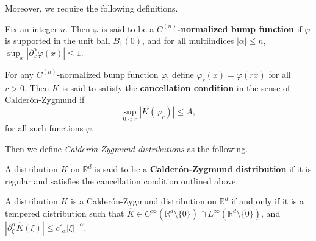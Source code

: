 \documentclass{article}
\begin{document}
Moreover, we require the following definitions. 

\begin{definition}
	Fix an integer $n$. Then $\varphi$ is said to be a \textbf{$C^{(n)}$-normalized bump function} if $\varphi$ is supported in the unit ball $B_{1}(0)$, and for all multiindices $|\alpha|\leq n$, $\sup_{x}|\partial_{x}^{\alpha}\varphi(x)|\leq 1$. 
\end{definition} 
\begin{definition}
	For any $C^{(n)}$-normalized bump function $\varphi$, define $\varphi_{r}(x) = \varphi(rx)$ for all $r > 0$. Then $K$ is said to satisfy the \textbf{cancellation condition} in the sense of Calder{\'o}n-Zygmund if 
	\begin{equation}
		\sup_{0 < r}|K(\varphi_{r})| \leq A, 
	\end{equation}
	for all such functions $\varphi$. 
\end{definition} 
Then we define \textit{Calder{\'on}-Zygmund distributions} as the following. 
\begin{definition}
	A distribution $K$ on $\mathbb{R}^{d}$ is said to be a \textbf{Calder\'on-Zygmund distribution} if it is regular and satisfies the cancellation condition outlined above. 
\end{definition} 

\begin{prop}
	A distribution $K$ is a Calder\'on-Zygmund distribution on $\mathbb{R}^{d}$ if and only if it is a tempered distribution such that $\hat{K} \in C^{\infty}(\mathbb{R}^{d}\setminus \{0\}) \cap L^{\infty}(\mathbb{R}^{d}\setminus \{0\})$, and $|\partial_{\xi}^{\alpha}\hat{K}(\xi)| \leq c'_{\alpha}|\xi|^{-\alpha}$. 
\end{prop} 
\end{document}
